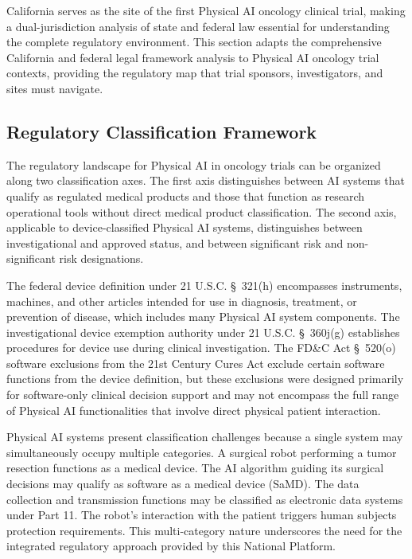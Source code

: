 
California serves as the site of the first Physical AI oncology clinical trial,
making a dual-jurisdiction analysis of state and federal law essential for
understanding the complete regulatory environment. This section adapts the
comprehensive California and federal legal framework analysis to Physical AI
oncology trial contexts, providing the regulatory map that trial sponsors,
investigators, and sites must navigate.

\subsection{Regulatory Classification Framework}
\label{subsec:regulatory-classification}

The regulatory landscape for Physical AI in oncology trials can be organized
along two classification axes. The first axis distinguishes between AI systems
that qualify as regulated medical products and those that function as research
operational tools without direct medical product classification. The second axis,
applicable to device-classified Physical AI systems, distinguishes between
investigational and approved status, and between significant risk and
non-significant risk designations.

The federal device definition under 21 U.S.C. \S~321(h) encompasses instruments,
machines, and other articles intended for use in diagnosis, treatment, or
prevention of disease, which includes many Physical AI system components. The
investigational device exemption authority under 21 U.S.C. \S~360j(g)
establishes procedures for device use during clinical investigation. The FD\&C
Act \S~520(o) software exclusions from the 21st Century Cures Act exclude
certain software functions from the device definition, but these exclusions were
designed primarily for software-only clinical decision support and may not
encompass the full range of Physical AI functionalities that involve direct
physical patient interaction.

Physical AI systems present classification challenges because a single system
may simultaneously occupy multiple categories. A surgical robot performing a
tumor resection functions as a medical device. The AI algorithm guiding its
surgical decisions may qualify as software as a medical device (SaMD). The data
collection and transmission functions may be classified as electronic data
systems under Part 11. The robot's interaction with the patient triggers human
subjects protection requirements. This multi-category nature underscores the
need for the integrated regulatory approach provided by this National Platform.

